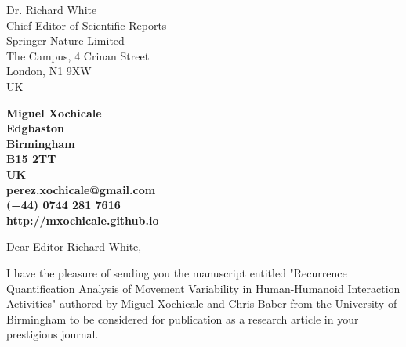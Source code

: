 \documentclass[10pt]{letter}
\begin{document}
\begin{letter}{Dr. Richard White \\
Chief Editor of Scientific Reports \\
Springer Nature Limited \\
The Campus, 4 Crinan Street\\
London, N1 9XW \\
UK
} 

\begin{flushright}
\large\bf Miguel Xochicale \\ %
Edgbaston\\
Birmingham\\
B15 2TT\\
UK\\
\faEnvelopeO  perez.xochicale@gmail.com \\
\faMobile  (+44) 0744 281 7616 \\
\faHome \href{http://mxochicale.github.io}{http://mxochicale.github.io}
\end{flushright} 

\vspace{20pt}
\signature{Miguel Xochicale} %


\opening{Dear Editor Richard White,}

I have the pleasure of sending you the manuscript entitled 
"Recurrence Quantification Analysis of Movement Variability in Human-Humanoid Interaction Activities"
authored by Miguel Xochicale and Chris Baber from the University of Birmingham to be considered for publication as a research article in your prestigious journal.


\end{letter}
\end{document}
